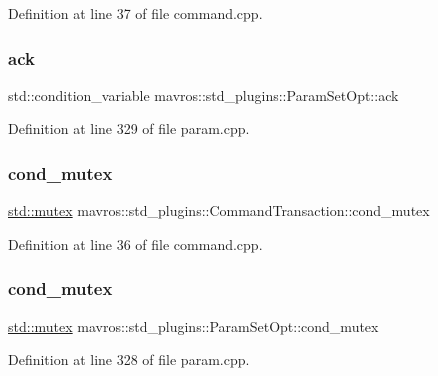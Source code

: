 Definition at line 37 of file command.\+cpp.

\mbox{\label{group__plugin_ga621db3cd15ad70ca2fbbf3eb6b8363af}} 
\subsubsection{\texorpdfstring{ack}{ack}\hspace{0.1cm}{\footnotesize\ttfamily [2/2]}}
{\footnotesize\ttfamily std\+::condition\+\_\+variable mavros\+::std\+\_\+plugins\+::\+Param\+Set\+Opt\+::ack}



Definition at line 329 of file param.\+cpp.

\mbox{\label{group__plugin_gaf3f74e20bdc98d39e8aedab007212e66}} 
\subsubsection{\texorpdfstring{cond\_mutex}{cond\_mutex}\hspace{0.1cm}{\footnotesize\ttfamily [1/2]}}
{\footnotesize\ttfamily \mbox{\hyperlink{data_8c_a4acff8232e4aec9cd5c6dc200ac55ef3}{std\+::mutex}} mavros\+::std\+\_\+plugins\+::\+Command\+Transaction\+::cond\+\_\+mutex}



Definition at line 36 of file command.\+cpp.

\mbox{\label{group__plugin_gaf0fa92985f3662f53eb22c56db12d544}} 
\subsubsection{\texorpdfstring{cond\_mutex}{cond\_mutex}\hspace{0.1cm}{\footnotesize\ttfamily [2/2]}}
{\footnotesize\ttfamily \mbox{\hyperlink{data_8c_a4acff8232e4aec9cd5c6dc200ac55ef3}{std\+::mutex}} mavros\+::std\+\_\+plugins\+::\+Param\+Set\+Opt\+::cond\+\_\+mutex}



Definition at line 328 of file param.\+cpp.

\mbox{\label{group__plugin_ga9795eedbcdd190f5131ceee05829bea1}} 
